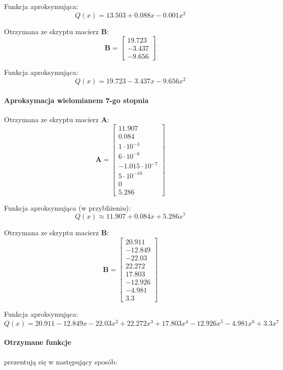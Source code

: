\documentclass[a4paper, 12pt]{mwart}
\begin{document}
					Funkcja aproksymująca: 
					$$ Q(x) = 13.503 + 0.088x - 0.001x^2 $$

					Otrzymana ze skryptu macierz $\textbf{B}$:
					$$\textbf{B} = \begin{bmatrix}
						19.723\\
						-3.437\\
						-9.656
					\end{bmatrix}$$

					Funkcja aproksymująca:
					$$ Q(x) = 19.723 - 3.437x - 9.656x^2$$

				\paragraph{Aproksymacja wielomianem 7-go stopnia}

					Otrzymana ze skryptu macierz $\textbf{A}$:
					$$\textbf{A} = \begin{bmatrix}
						11.907\\
						0.084\\
						1\cdot 10^{-4}\\
						6\cdot 10^{-6}\\
						-1.015\cdot 10^{-7}\\
						5 \cdot 10^{-10}\\
						0\\
						5.286
					\end{bmatrix}$$

					Funkcja aproksymująca (w przybliżeniu):
					$$ Q(x) \approx 11.907 + 0.084x + 5.286 x^7 $$

					Otrzymana ze skryptu macierz $\textbf{B}$:
					$$\textbf{B} = \begin{bmatrix}
						20.911\\
						-12.849\\
						-22.03\\
						22.272\\
						17.803\\
						-12.926\\
						-4.981\\
						3.3
					\end{bmatrix}$$

					Funkcja aproksymująca:
					$$ Q(x) = 20.911 - 12.849x - 22.03x^2 + 22.272x^3 + 17.803x^4 - 12.926x^5 - 4.981x^6 + 3.3x^7 $$


				\paragraph{Otrzymane funkcje} prezentują się w następujący sposób:
\end{document}
